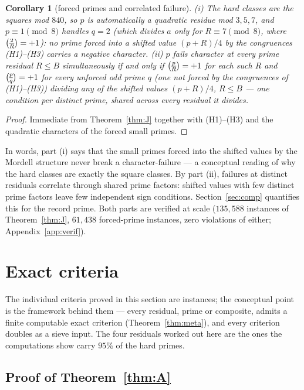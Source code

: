 \documentclass[11pt]{article}
\theoremstyle{plain}
\newtheorem{corollary}[theorem]{Corollary}
\theoremstyle{remark}
\theoremstyle{plain}
\numberwithin{equation}{section}
\newcommand{\legendre}[2]{\genfrac{(}{)}{}{1}{#1}{#2}}
\begin{document}
\begin{corollary}[forced primes and correlated failure]\label{cor:J}
(i) The hard classes are the squares mod $840$, so $p$ is automatically
a quadratic residue mod $3, 5, 7$, and $p \equiv 1 \pmod 8$ handles
$q = 2$ (which divides $a$ only for $R \equiv 7 \pmod 8$, where
$\smash{\legendre{2}{R}} = +1$): no prime forced into a shifted value
$(p+R)/4$ by the congruences (H1)--(H3) carries a negative character.
(ii) $p$ fails character at every prime
residual $R \le B$ simultaneously if and only if
$\smash{\legendre{p}{R}} = +1$ for each such $R$ and
$\smash{\legendre{p}{q}} = +1$ for every \emph{unforced} odd prime $q$
(one not forced by the congruences of (H1)--(H3)) dividing any of the
\emph{shifted values} $(p+R)/4$, $R \le B$ --- one condition per
distinct prime, shared across every residual it divides.
\end{corollary}

\begin{proof}
Immediate from Theorem~\ref{thm:J} together with (H1)--(H3) and the
quadratic characters of the forced small primes.
\end{proof}

In words, part (i) says that the small primes forced into the shifted
values by the Mordell structure never break a character-failure --- a
conceptual reading of why the hard classes are exactly the square
classes. By part (ii), failures at distinct residuals
correlate through shared prime factors: shifted values with few
distinct prime factors leave few independent sign conditions.
Section~\ref{sec:comp} quantifies this for the record prime. Both
parts are verified at scale ($135{,}588$ instances of
Theorem~\ref{thm:J}, $61{,}438$ forced-prime instances, zero
violations of either; Appendix~\ref{app:verif}).

\section{Exact criteria}\label{sec:exact}

The individual criteria proved in this section are instances; the
conceptual point is the framework behind them --- every residual,
prime or composite, admits a finite computable exact criterion
(Theorem~\ref{thm:meta}), and every criterion doubles as a sieve
input. The four residuals worked out here are the ones the
computations show carry $95\%$ of the hard primes.

\subsection{Proof of Theorem~\ref{thm:A}}
\end{document}
